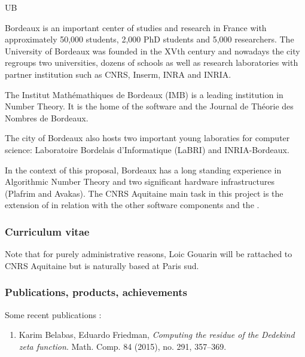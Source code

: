 \begin{sitedescription}{UB}


Bordeaux is an important center of studies and research in France
with approximately 50,000 students, 2,000 PhD students and 5,000
researchers. The University of Bordeaux was founded in the XVth
century and nowadays the city regroups two universities, dozens of
schools as well as  research laboratories with partner institution such
as CNRS, Inserm, INRA and INRIA.

The Institut Math\'emathiques de Bordeaux (IMB) is a leading
institution in Number Theory. It is the home of the software
\PariGP and the Journal de Th\'eorie des Nombres de Bordeaux.

The city of Bordeaux also hosts two important young laboraties
for computer science: Laboratoire Bordelais d'Informatique (LaBRI)
and INRIA-Bordeaux.

\medskip
In the context of this proposal, Bordeaux has a long standing experience in
Algorithmic Number Theory and two significant hardware infrastructures
(Plafrim and Avakas). The CNRS Aquitaine main task in this project is the
extension of \PariGP in relation with the other software components and
the .

\subsubsection*{Curriculum vitae}
Note that for purely administrative reasons, Loic Gouarin will be rattached to
CNRS Aquitaine but is naturally based at Paris sud.









\subsubsection*{Publications, products, achievements}

Some recent publications :
\begin{enumerate}
\item 
Karim Belabas, Eduardo Friedman,
\textit{Computing the residue of the Dedekind zeta function}.
Math. Comp. 84 (2015), no. 291, 357–369. 


\end{enumerate}
\end{sitedescription}
